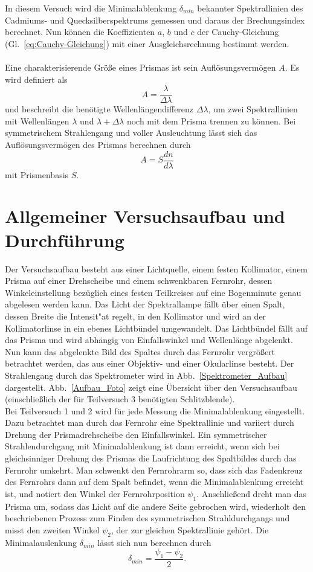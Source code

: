 \documentclass[12pt,a4paper]{article}
\begin{document}
In diesem Versuch wird die Minimalablenkung $\delta_{min}$ bekannter Spektrallinien des Cadmiums- und Quecksilberspektrums gemessen und daraus der Brechungsindex berechnet. Nun können die Koeffizienten $a$, $b$ und $c$ der Cauchy-Gleichung (Gl.~\eqref{eq:Cauchy-Gleichung}) mit einer Ausgleichsrechnung bestimmt werden.\\\\
Eine charakterisierende Größe eines Prismas ist sein Auflösungsvermögen $A$. Es wird definiert als 
\begin{equation}
A=\frac{\lambda}{\Delta\lambda}
\end{equation}
und beschreibt die benötigte Wellenlängendifferenz $\Delta\lambda$, um zwei Spektrallinien mit Wellenlängen $\lambda$ und $\lambda+\Delta\lambda$ noch mit dem Prisma trennen zu können. Bei symmetrischem Strahlengang und voller Ausleuchtung lässt sich das Auflösungsvermögen des Prismas berechnen durch
\begin{equation}
A=S\frac{dn}{d\lambda}
\end{equation}
mit Prismenbasis $S$.
\section{Allgemeiner Versuchsaufbau und Durchführung}
Der Versuchsaufbau besteht aus einer Lichtquelle, einem festen Kollimator, einem Prisma auf einer Drehscheibe und einem schwenkbaren Fernrohr, dessen Winkeleinstellung bezüglich eines festen Teilkreises auf eine Bogenminute genau abgelesen werden kann. Das Licht der Spektrallampe fällt über einen Spalt, dessen Breite die Intensit"at regelt, in den Kollimator und wird an der Kollimatorlinse in ein ebenes Lichtbündel umgewandelt. Das Lichtbündel fällt auf das Prisma und wird abhängig von Einfallswinkel und Wellenlänge abgelenkt. Nun kann das abgelenkte Bild des Spaltes durch das Fernrohr vergrößert betrachtet werden, das aus einer Objektiv- und einer Okularlinse besteht. Der Strahlengang durch das Spektrometer wird in Abb.~\ref{Spektrometer_Aufbau} dargestellt. Abb.~\ref{Aufbau_Foto} zeigt eine Übersicht über den Versuchsaufbau (einschließlich der für Teilversuch 3 benötigten Schlitzblende).\\
Bei Teilversuch 1 und 2 wird für jede Messung die Minimalablenkung eingestellt. Dazu betrachtet man durch das Fernrohr eine Spektrallinie und variiert durch Drehung der Prismadrehscheibe den Einfallswinkel. Ein symmetrischer Strahlendurchgang mit Minimalablenkung ist dann erreicht, wenn sich bei gleichsinniger Drehung des Prismas die Laufrichtung des Spaltbildes durch das Fernrohr umkehrt. Man schwenkt den Fernrohrarm so, dass sich das Fadenkreuz des Fernrohrs dann auf dem Spalt befindet, wenn die Minimalablenkung erreicht ist, und notiert den Winkel der Fernrohrposition $\psi_1$. Anschließend dreht man das Prisma um, sodass das Licht auf die andere Seite gebrochen wird, wiederholt den beschriebenen Prozess zum Finden des symmetrischen Strahldurchgangs und misst den zweiten Winkel $\psi_2$, der zur gleichen Spektrallinie gehört. Die Minimalauslenkung $\delta_{min}$ lässt sich nun berechnen durch
\begin{equation}\label{eq:delmin_aus_psi}
\delta_{min}=\frac{\psi_1-\psi_2}{2}.
\end{equation}
\end{document}
